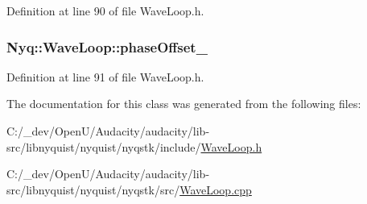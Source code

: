 Definition at line 90 of file Wave\+Loop.\+h.

\subsubsection[{\texorpdfstring{phase\+Offset\+\_\+}{phaseOffset_}}]{ Nyq\+::\+Wave\+Loop\+::phase\+Offset\+\_\+\hspace{0.3cm}{\ttfamily [protected]}}\hypertarget{class_nyq_1_1_wave_loop_a78ba0809aa76dc73c7858e3c19277406}{}\label{class_nyq_1_1_wave_loop_a78ba0809aa76dc73c7858e3c19277406}


Definition at line 91 of file Wave\+Loop.\+h.



The documentation for this class was generated from the following files\+:\begin{DoxyCompactItemize}
\item 
C\+:/\+\_\+dev/\+Open\+U/\+Audacity/audacity/lib-\/src/libnyquist/nyquist/nyqstk/include/\hyperlink{_wave_loop_8h}{Wave\+Loop.\+h}\item 
C\+:/\+\_\+dev/\+Open\+U/\+Audacity/audacity/lib-\/src/libnyquist/nyquist/nyqstk/src/\hyperlink{_wave_loop_8cpp}{Wave\+Loop.\+cpp}\end{DoxyCompactItemize}
